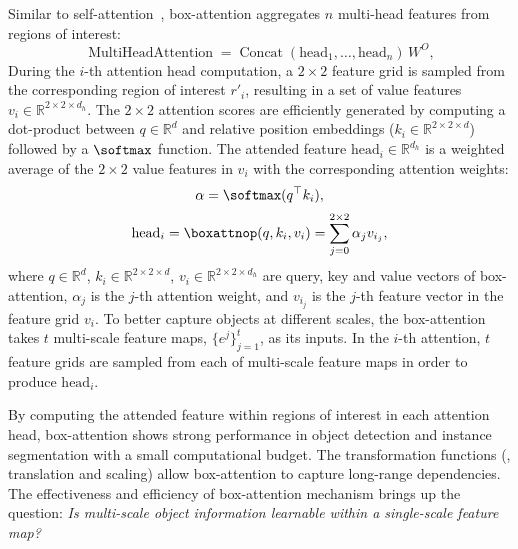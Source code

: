 Similar to self-attention~\cite{vaswani2017transformer}, box-attention aggregates $n$ multi-head features from regions of interest:
%
\begin{equation}
\label{eq:multihead}
    \mathop{\mathrm{MultiHeadAttention}} = \mathop{\mathrm{Concat}}(\mathrm{head}_1, \ldots, \mathrm{head}_n) \, W^O,
\end{equation}
%
During the $i$-th attention head computation, a $2 {\times} 2$ feature grid is sampled from the corresponding region of interest $r'_i$, resulting in a set of value features $v_i \in \mathbb{R}^{2 \times 2 \times d_h}$. The $2 {\times} 2$ attention scores are efficiently generated by computing a dot-product between $q \in \mathbb{R}^d$ and relative position embeddings ($k_i \in \mathbb{R}^{2 \times 2 \times d}$) followed by a $\softmax$ function. The attended feature $\mathrm{head}_i \in \mathbb{R}^{d_h}$ is a weighted average of the $2 {\times} 2$ value features in $v_i$ with the corresponding attention weights:
%
\begin{equation}
    \alpha =  \softmax(q^{\top} {k_i}),
\end{equation}
\begin{equation}
    \mathrm{head}_i = \mathop{\mathrm{\boxattnop}}(q, k_i, v_i) = \sum_{j=0}^{2 \times 2} \alpha_j v_{i_j},
\end{equation}
%
where $q \in \mathbb{R}^d$, $k_i \in \mathbb{R}^{2 \times 2 \times d}$, $v_i \in \mathbb{R}^{2 \times 2 \times d_h}$ are query, key and value vectors of box-attention, $\alpha_j$ is the $j$-th attention weight, and $v_{i_j}$ is the $j$-th feature vector in the feature grid $v_i$. To better capture objects at different scales, the box-attention~\cite{nguyen2022boxer} takes $t$ multi-scale feature maps, $\{e^j\}_{j=1}^t$, as its inputs. In the $i$-th attention, $t$ feature grids are sampled from each of multi-scale feature maps in order to produce $\mathrm{head}_i$.

By computing the attended feature within regions of interest in each attention head, box-attention shows strong performance in object detection and instance segmentation with a small computational budget. The transformation functions (\ie, translation and scaling) allow box-attention to capture long-range dependencies. The effectiveness and efficiency of box-attention mechanism brings up the question: \textit{Is multi-scale object information learnable within a single-scale feature map?}
